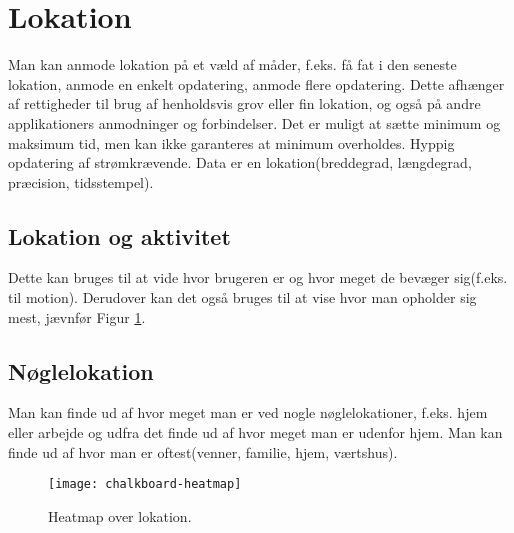 \section{Lokation}
Man kan anmode lokation på et væld af måder, f.eks. få fat i den seneste lokation, anmode en enkelt opdatering, anmode flere opdatering. 
Dette afhænger af rettigheder til brug af henholdsvis grov eller fin lokation, og også på andre applikationers anmodninger og forbindelser. Det er muligt at sætte minimum og maksimum tid, men kan ikke garanteres at minimum overholdes. Hyppig opdatering af strømkrævende. 
Data er en lokation(breddegrad, længdegrad, præcision, tidsstempel).

\subsection{Lokation og aktivitet}
Dette kan bruges til at vide hvor brugeren er og hvor meget de bevæger sig(f.eks. til motion).
Derudover kan det også bruges til at vise hvor man opholder sig mest, jævnfør Figur \ref{heatmap}.
\subsection{Nøglelokation}
Man kan finde ud af hvor meget man er ved nogle nøglelokationer, f.eks. hjem eller arbejde og udfra det finde ud af hvor meget man er udenfor hjem. Man kan finde ud af hvor man er oftest(venner, familie, hjem, værtshus).

\begin{figure}[h]
	\centering
	\texttt{[image: chalkboard-heatmap]}
	\caption{Heatmap over lokation.}\label{heatmap}
\end{figure}
